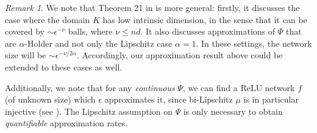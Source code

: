 \documentclass{amsart}
\theoremstyle{plain}
\theoremstyle{definition}
\theoremstyle{remark}
\newtheorem*{remark}{Remark}
\newcommand{\RR}{\mathbb{R}}
\newcommand{\abs}[1]{\left\lvert#1\right\rvert}
\begin{document}
\begin{remark}
We note that Theorem 21 in \cite{newPaper} is more general: firstly, it discusses the case where the domain $K$ has low intrinsic dimension, in the sense that it can be covered by $\sim \epsilon^{-\nu}$ balls, where $\nu \leq nd$. It also discusses approximations of $\Psi$ that are $\alpha$-Holder and not only the Lipschitz case $\alpha=1$. In these settings, the network size will be $\sim \epsilon^{-\nu/2\alpha} $. Accordingly, our approximation result above could be extended to these cases as well. 

Additionally, we note that for any \emph{continuous} $\Psi$, we can find a ReLU network $f$ (of unknown size) which $\epsilon$ approximates it, since bi-Lipschitz $\mu$ is in particular injective (see \cite{dym2024low}). The Lipschitz assumption on $\Psi$ is only necessary to obtain \emph{quantifiable} approximation rates. 
\end{remark}
\end{document}
